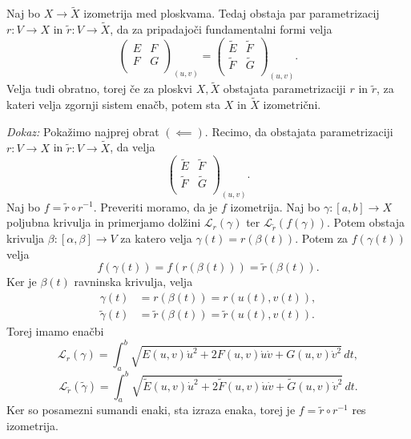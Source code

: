 \begin{izrek}
\label{izr_izometricnost_in_prva_forma}
Naj bo $X \to  \tilde{X}$ izometrija med ploskvama. Tedaj obstaja par parametrizacij
$r : V \to X$ in $\tilde{r}: V \to  \tilde{X}$, da za pripadajoči
fundamentalni formi velja 
\begin{equation*} 
\begin{pmatrix}
	E & F \\
	F & G \\
\end{pmatrix}_{(u,v)}
=
\begin{pmatrix}
	\tilde{E}  & \tilde{F}  \\
	\tilde{F}  & \tilde{G}  \\
\end{pmatrix}_{(u,v)}
.\end{equation*}
Velja tudi obratno, torej če za ploskvi $X, \tilde{X} $ obstajata
parametrizaciji $r$ in $\tilde{r}$, za kateri velja zgornji sistem
enačb, potem sta $X$ in $\tilde{X}$ izometrični.
\end{izrek}
{\em Dokaz:\/}
Pokažimo najprej obrat $(\impliedby)$. Recimo, da obstajata parametrizaciji $r: V
\to  X$ in $\tilde{r}: V \to  \tilde{X} $, da velja 
\begin{equation*} 
\begin{pmatrix}
	\tilde{E}  & \tilde{F}  \\
	\tilde{F}  & \tilde{G}  \\
\end{pmatrix}_{(u,v)}
.\end{equation*} 
Naj bo $f = \tilde{r} \circ  r^{-1}$. Preveriti moramo, da je $f$
izometrija. Naj bo $\gamma: [a,b] \to  X$ poljubna krivulja in
primerjamo dolžini $\mathcal{L}_r(\gamma)$ ter
$\mathcal{L}_{\tilde{r}}(f(\gamma))$. Potem obstaja krivulja $\beta:
[\alpha,\beta] \to  V$ za katero velja $\gamma(t) = r(\beta(t))$.
Potem za $f(\gamma(t))$ velja 
\begin{equation*} f(\gamma(t)) = f(r(\beta(t))) = \tilde{r}(\beta(t)).\end{equation*}
Ker je $\beta(t)$ ravninska krivulja, velja 
\begin{align*}
    \gamma(t) &= r(\beta(t)) = r(u(t), v(t)), \\
    \tilde{\gamma}(t) &= \tilde{r} (\beta(t)) = \tilde{r} (u(t), v(t)).   
\end{align*}
Torej imamo enačbi 
\begin{equation*} \mathcal{L}_r(\gamma) = \int_{a}^{b} \sqrt{E(u,v)\dot{u}^2 +
2F(u,v)\dot{u}\dot{v} + G(u,v)\dot{v}^2} \, dt, \end{equation*}
\begin{equation*} \mathcal{L}_{\tilde{r}}(\tilde{\gamma}) = \int_{a}^{b} \sqrt{\tilde{E} (u,v)\dot{u}^2 +
2\tilde{F}(u,v)\dot{u}\dot{v} + \tilde{G}(u,v)\dot{v}^2} \, dt.  \end{equation*}
Ker so posamezni sumandi enaki, sta izraza enaka, torej je $f =
\tilde{r} \circ r^{-1}$ res izometrija.

